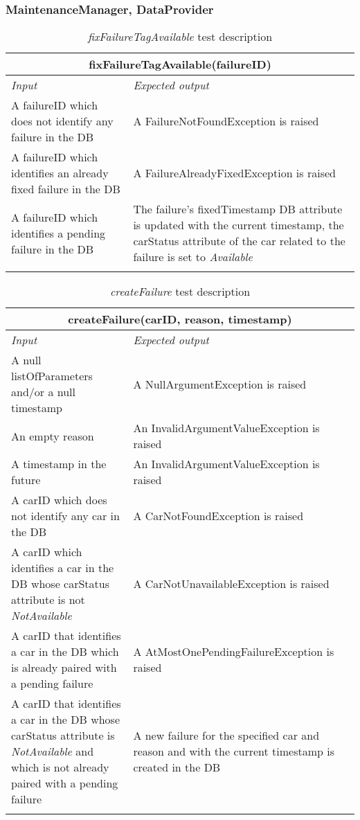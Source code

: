 \subsubsection{MaintenanceManager, DataProvider}

\begin{longtable}{p{0.35\linewidth}p{0.65\linewidth}}
\multicolumn{2}{c}{\textbf{fixFailureTagAvailable(failureID)}} \\
\toprule
\emph{Input} & \emph{Expected output} \\
\midrule
A failureID which does not identify any failure in the DB & A FailureNotFoundException is raised\\
\midrule
A failureID which identifies an already fixed failure in the DB & A FailureAlreadyFixedException is raised\\
\midrule
A failureID which identifies a pending failure in the DB & The failure's fixedTimestamp DB attribute is updated with the current timestamp, the carStatus attribute of the car related to the failure is set to \emph{Available}\\
\bottomrule
\caption{\emph{fixFailureTagAvailable} test description}
\end{longtable}

\begin{longtable}{p{0.35\linewidth}p{0.65\linewidth}}
\multicolumn{2}{c}{\textbf{createFailure(carID, reason, timestamp)}} \\
\toprule
\emph{Input} & \emph{Expected output} \\
\midrule
A null listOfParameters and/or a null timestamp & A NullArgumentException is raised\\
\midrule
An empty reason & An InvalidArgumentValueException is raised \\
\midrule
A timestamp in the future & An InvalidArgumentValueException is raised \\
\midrule
A carID which does not identify any car in the DB & A CarNotFoundException is raised\\
\midrule
A carID which identifies a car in the DB whose carStatus attribute is not \emph{NotAvailable} & A CarNotUnavailableException is raised\\
\midrule
A carID that identifies a car in the DB which is already paired with a pending failure & A AtMostOnePendingFailureException is raised\\
\midrule
A carID that identifies a car in the DB whose carStatus attribute is \emph{NotAvailable} and which is not already paired with a pending failure & A new failure for the specified car and reason and with the current timestamp is created in the DB\\
\bottomrule
\caption{\emph{createFailure} test description}
\end{longtable}

